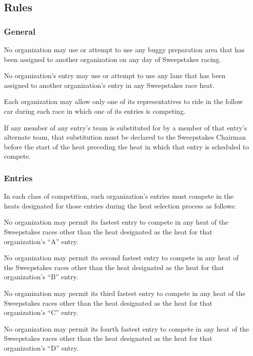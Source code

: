 \subsection{Rules}

\subsubsection{General}

	No organization may use or attempt to use any buggy preparation area that has
	been assigned to another organization on any day of Sweepstakes racing.

	No organization's entry may use or attempt to use any lane that has been
	assigned to another organization's entry in any Sweepstakes race heat.

	Each organization may allow only one of its representatives to ride in the
	follow car during each race in which one of its entries is competing.

	If any member of any entry's team is substituted for by a member of that
	entry's alternate team, that substitution must be declared to the Sweepstakes
	Chairman before the start of the heat preceding the heat in which that entry is
	scheduled to compete.

\subsubsection{Entries}

	In each class of competition, each organization's entries must compete in the
	heats designated for those entries during the heat selection process as
	follows:

	No organization may permit its fastest entry to compete in any heat of the
	Sweepstakes races other than the heat designated as the heat for that
	organization's ``A'' entry.

	No organization may permit its second fastest entry to compete in any heat of
	the Sweepstakes races other than the heat designated as the heat for that
	organization's ``B'' entry.

	No organization may permit its third fastest entry to compete in any heat of
	the Sweepstakes races other than the heat designated as the heat for that
	organization's ``C'' entry.

	No organization may permit its fourth fastest entry to compete in any heat of
	the Sweepstakes races other than the heat designated as the heat for that
	organization's ``D'' entry.

